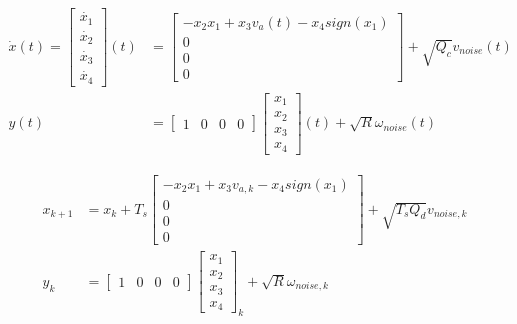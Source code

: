 	
	\begin{tcolorbox}[title=In continuous nonlinear stochastic system matrix form]
		\begin{equation}
			\begin{split}
					\dot{x}(t) =
					\begin{bmatrix}
						\dot{x_1} \\
						\dot{x_2} \\
						\dot{x_3} \\
						\dot{x_4} 
					\end{bmatrix}(t) &=
					\begin{bmatrix}
						-x_2 x_1 + x_3 v_a(t) - x_4sign(x_1) \\
						0                                    \\
						0                                    \\
						0                                    
					\end{bmatrix} +\sqrt{Q_c}v_{noise}(t)\\
					y(t) &= 
					\begin{bmatrix}
						1 & 0 & 0 & 0 
					\end{bmatrix}
					\begin{bmatrix}
						x_1 \\
						x_2 \\
						x_3 \\
						x_4 
					\end{bmatrix}(t)+\sqrt{R}\omega_{noise}(t)
			\end{split}
			\label{dcmotorideq11}
		\end{equation}
	\end{tcolorbox}
	
	
	\begin{tcolorbox}[title=Discretized nonlinear stochastic system in matrix form]
		\begin{equation}
			\begin{split}
					x_{k+1} &= x_k + T_s
					\begin{bmatrix}
						-x_2 x_1 + x_3 v_{a,k} - x_4sign(x_1) \\
						0                                     \\
						0                                     \\
						0                                     
					\end{bmatrix} +\sqrt{T_s Q_d}v_{noise,k}\\
					y_k &= 
					\begin{bmatrix}
						1 & 0 & 0 & 0 
					\end{bmatrix}
					\begin{bmatrix}
						x_1 \\
						x_2 \\
						x_3 \\
						x_4 
					\end{bmatrix}_k+\sqrt{R}\omega_{noise,k}
			\end{split}
			\label{dcmotorideq12}
		\end{equation}
	\end{tcolorbox}
	

